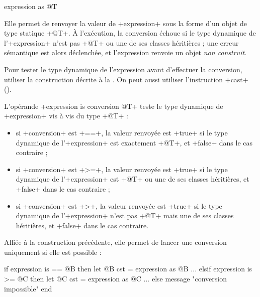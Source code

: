 \begin{galgas}
expression as @T
\end{galgas}

Elle permet de renvoyer la valeur de \ggs+expression+ sous la forme d'un objet de type statique \ggs+@T+. À l'exécution, la conversion échoue si le type dynamique de l'\ggs+expression+ n'est pas \ggs+@T+ ou une de ses classes héritières ; une erreur sémantique est alors déclenchée, et l'expression renvoie un objet \emph{non construit}.

Pour tester le type dynamique de l'expression avant d'effectuer la conversion, utiliser la construction décrite à la . On peut aussi utiliser l'instruction \ggs+cast+ ().








L'opérande \ggs+expression is conversion @T+ teste le type dynamique de \ggs+expression+ vis à vis du type \ggs+@T+ :
\begin{itemize}
\item si \ggs+conversion+ est \ggs+==+, la valeur renvoyée est \ggs+true+ si le type dynamique de l'\ggs+expression+ est exactement \ggs+@T+, et \ggs+false+ dans le cas contraire ;
\item si \ggs+conversion+ est  \ggs+>=+, la valeur renvoyée est \ggs+true+ si le type dynamique de l'\ggs+expression+ est \ggs+@T+ ou une de ses classes héritières, et \ggs+false+ dans le cas contraire ;
\item si \ggs+conversion+ est  \ggs+>+, la valeur renvoyée est \ggs+true+ si le type dynamique de l'\ggs+expression+ n'est pas \ggs+@T+ mais une de ses classes héritières, et \ggs+false+ dans le cas contraire.
\end{itemize}



Alliée à la construction précédente, elle permet de lancer une conversion uniquement si elle est possible :

\begin{galgas}
if expression is == @B then
  let @B cst = expression as @B
  ...
elsif expression is >= @C then
  let @C cst = expression as @C
  ...
else
  message "conversion impossible"
end
\end{galgas}





